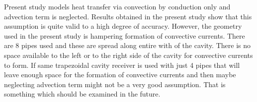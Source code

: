 Present study models heat transfer via convection by conduction only and advection term is neglected. Results obtained in the present study show that this assumption is quite valid to a high degree of accuracy. However, the geometry used in the present study is hampering formation of convective currents. There are 8 pipes used and these are spread along entire with of the cavity. There is no space available to the left or to the right side of the cavity for convective currents to form. If same trapezoidal cavity receiver is used with just 4 pipes that will leave enough space for the formation of convective currents and then maybe neglecting advection term might not be a very good assumption. That is something which should be examined in the future.
